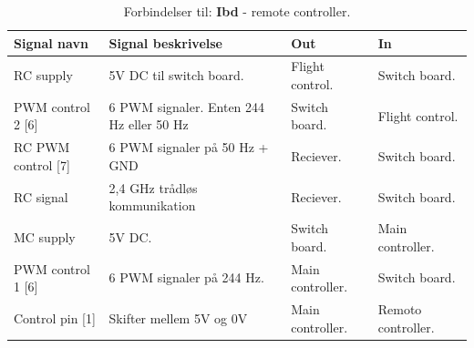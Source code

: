 \begin{table}[H]
	\centering
		\begin{tabular}{|p{3.5 cm}|p{4.5 cm}|p{2.6 cm}|p{2.6 cm}|} 
		\hline
			\textbf{Signal navn} 	& \textbf{Signal beskrivelse}		& \textbf{Out} 				& \textbf{In}     \\ \hline
			RC supply & 5V DC til switch board. & Flight control. & Switch board.	\\ \hline	
			PWM control 2 [6] & 6 PWM signaler. \newline Enten 244 Hz eller 50 Hz & Switch board. & Flight control.				\\ \hline
					
			RC PWM control [7] & 6 PWM signaler på 50 Hz \newline + GND & Reciever. & Switch board.				\\ \hline
			RC signal & 2,4 GHz trådløs \newline kommunikation & Reciever. & Switch board.				\\ \hline
			
			MC supply 			& 5V DC. 						& Switch board.  & Main controller.	\\ \hline
			PWM control 1 [6] 	& 6 PWM signaler på 244 Hz. 	& Main controller. & Switch board. \\ \hline
			Control pin [1]		& Skifter mellem 5V og 0V		& Main controller.	& Remoto \newline  controller.    \\ \hline
		\end{tabular}
	\caption{Forbindelser til: \textbf{Ibd} - remote controller. }
	\label{tab:ibd_remote_controller}
\end{table}



